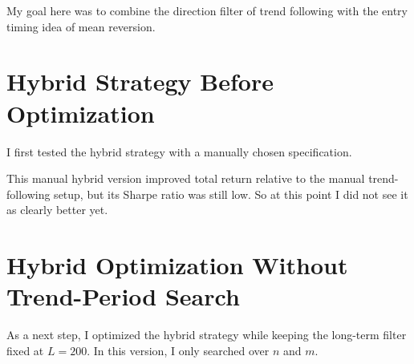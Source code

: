 \documentclass[11pt]{article}
\begin{document}
My goal here was to combine the direction filter of trend following with the entry timing idea of mean reversion.

\section{Hybrid Strategy Before Optimization}
I first tested the hybrid strategy with a manually chosen specification.

\begin{table}[H]
\centering
\caption{Manual Hybrid Strategy}
\label{tab:manual_hybrid}
\end{table}

This manual hybrid version improved total return relative to the manual trend-following setup, but its Sharpe ratio was still low. So at this point I did not see it as clearly better yet.

\section{Hybrid Optimization Without Trend-Period Search}
As a next step, I optimized the hybrid strategy while keeping the long-term filter fixed at $L=200$. In this version, I only searched over $n$ and $m$.

\begin{table}[H]
\centering
\caption{Hybrid Optimization with Fixed Trend Period}
\label{tab:hybrid_fixed}
\end{table}
\end{document}

